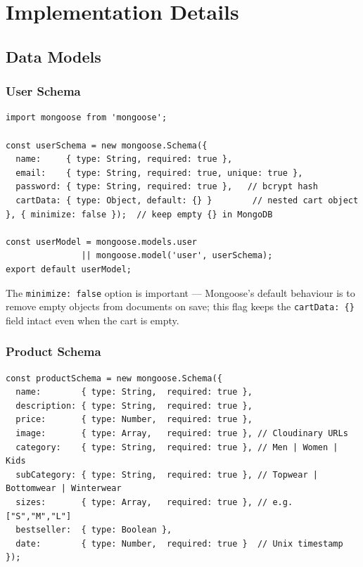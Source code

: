 \documentclass[12pt,a4paper]{report}
\begin{document}
\chapter{Implementation Details}
\label{ch:impl}

\section{Data Models}

\subsection{User Schema}

\begin{lstlisting}[caption={userModel.js}, label=lst:usermodel]
import mongoose from 'mongoose';

const userSchema = new mongoose.Schema({
  name:     { type: String, required: true },
  email:    { type: String, required: true, unique: true },
  password: { type: String, required: true },   // bcrypt hash
  cartData: { type: Object, default: {} }        // nested cart object
}, { minimize: false });  // keep empty {} in MongoDB

const userModel = mongoose.models.user
               || mongoose.model('user', userSchema);
export default userModel;
\end{lstlisting}

The \texttt{minimize: false} option is important — Mongoose's default behaviour is to remove
empty objects from documents on save; this flag keeps the \texttt{cartData: \{\}} field intact
even when the cart is empty.

\subsection{Product Schema}

\begin{lstlisting}[caption={productModel.js}, label=lst:productmodel]
const productSchema = new mongoose.Schema({
  name:        { type: String,  required: true },
  description: { type: String,  required: true },
  price:       { type: Number,  required: true },
  image:       { type: Array,   required: true }, // Cloudinary URLs
  category:    { type: String,  required: true }, // Men | Women | Kids
  subCategory: { type: String,  required: true }, // Topwear | Bottomwear | Winterwear
  sizes:       { type: Array,   required: true }, // e.g. ["S","M","L"]
  bestseller:  { type: Boolean },
  date:        { type: Number,  required: true }  // Unix timestamp
});
\end{lstlisting}
\end{document}
